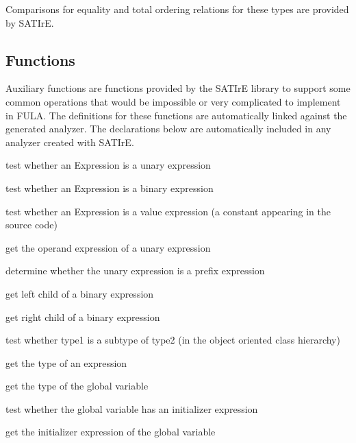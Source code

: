 \documentclass[a4paper,12pt]{report}
\begin{document}
Comparisons for equality and total ordering relations for these types are
provided by SATIrE.

\subsection{Functions}
\label{sec:support_functions}

Auxiliary functions are functions provided by the SATIrE library to support
some common operations that would be impossible or very complicated to
implement in FULA. The definitions for these functions are automatically
linked against the generated analyzer. The declarations below are
automatically included in any analyzer created with SATIrE.

\begin{description}
    test whether an Expression is a unary expression

    test whether an Expression is a binary expression

    test whether an Expression is a value expression (a constant appearing
    in the source code)

    get the operand expression of a unary expression

    determine whether the unary expression is a prefix expression

    get left child of a binary expression

    get right child of a binary expression

    test whether type1 is a subtype of type2 (in the object oriented class
    hierarchy)

    get the type of an expression

    get the type of the global variable

    test whether the global variable has an initializer expression

    get the initializer expression of the global variable


\end{description}
\end{document}
